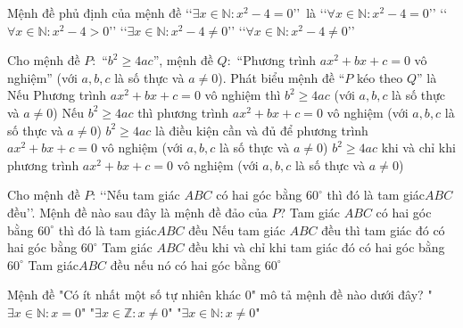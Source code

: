\begin{ex}%
	Mệnh đề phủ định của mệnh đề \lq \lq $\exists x\in \mathbb{N}\colon x^2-4=0$\rq \rq \ là
	\choice
	{\lq \lq $\forall x\in \mathbb{N}\colon x^2-4=0$\rq \rq }
	{\lq \lq $\forall x\in \mathbb{N}\colon x^2-4>0$\rq \rq }
	{\lq \lq $\exists x\in \mathbb{N}\colon x^2-4\ne 0$\rq \rq }
	{\True \lq \lq $\forall x\in \mathbb{N}\colon x^2-4\ne 0$\rq \rq}
\end{ex}
\begin{ex}%
	Cho mệnh đề $P\colon$ ``$b^2\ge 4ac$'', mệnh đề $Q\colon$ ``Phương trình $ax^2 +bx+c=0$ vô nghiệm'' (với $a,b,c$ là số thực và $a\ne 0$). Phát biểu mệnh đề ``$P$ kéo theo $Q$'' là
	\choice
	{Nếu Phương trình $ax^2 +bx+c=0$ vô nghiệm thì $b^2\ge 4ac$ (với $a,b,c$ là số thực và $a\ne 0$)}
	{\True Nếu $b^2\ge 4ac$ thì phương trình $ax^2 +bx+c=0$ vô nghiệm (với $a,b,c$ là số thực và $a\ne 0$) }
	{$b^2\ge 4ac$ là điều kiện cần và đủ để phương trình $ax^2 +bx+c=0$ vô nghiệm (với $a,b,c$ là số thực và $a\ne 0$)}
	{$b^2\ge 4ac$ khi và chỉ khi phương trình $ax^2 +bx+c=0$ vô nghiệm (với $a,b,c$ là số thực và $a\ne 0$)}
\end{ex}
\begin{ex}%
	Cho mệnh đề $P$: \lq\lq Nếu tam giác $ABC$ có hai góc bằng $60^{\circ}$ thì đó là tam giác$ABC$ đều\rq\rq. Mệnh đề nào sau đây là mệnh đề đảo của $P$?
	\choice
	{Tam giác $ABC$ có hai góc bằng $60^{\circ}$ thì đó là tam giác$ABC$ đều}
	{\True Nếu tam giác $ABC$ đều thì tam giác đó có hai góc bằng $60^{\circ}$}
	{Tam giác $ABC$ đều khi và chỉ khi tam giác đó có hai góc bằng $60^{\circ}$}
	{Tam giác$ABC$ đều nếu nó có hai góc bằng $60^{\circ}$}
\end{ex}
\begin{ex}%
	Mệnh đề "Có ít nhất một số tự nhiên khác 0" mô tả mệnh đề nào dưới đây?
	{"$\exists x\in\mathbb{N}:x=0$"}
	{"$\exists x\in\mathbb{Z}: x\neq 0$"}
	{\True "$\exists x\in\mathbb{N}:x\neq 0$"}
\end{ex}
